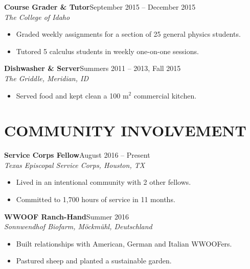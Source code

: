 \documentclass[margin]{res}
\newcommand\job[3]{\textbf{#1}\hfill {#2}\\ \emph{#3} }
\newenvironment{details}{\begin{itemize}[itemsep=0.6pt,topsep=2.2pt] }{\end{itemize} }
\begin{document}
\begin{resume}
\job{Course Grader \& Tutor}{September 2015 -- December 2015}{The College of Idaho}
	\begin{details}
        \item Graded weekly assignments for a section of 25 general physics students.
        \item Tutored 5 calculus students in weekly one-on-one sessions.
    \end{details}
              
\job{Dishwasher \& Server}{Summers 2011 -- 2013, Fall 2015}{The Griddle, Meridian, ID}
    \begin{details}
        \item Served food and kept clean a 100 $\mathrm{m}^2$ commercial kitchen.
    \end{details}    
   
\section{COMMUNITY INVOLVEMENT}
\job{Service Corps Fellow}{August 2016 -- Present}{Texas Episcopal Service Corps, Houston, TX}
	\begin{details}
    	\item Lived in an intentional community with 2 other fellows.
    	\item Committed to 1,700 hours of service in 11 months.
	\end{details}
            
\job{WWOOF Ranch-Hand}{Summer 2016}{Sonnwendhof Biofarm, M\"{o}ckm\"{u}hl, Deutschland}
    	\begin{details}
    		\item Built relationships with American, German and Italian WWOOFers.
            \item Pastured sheep and planted a sustainable garden.
     	\end{details}
            

\end{resume}
\end{document}
